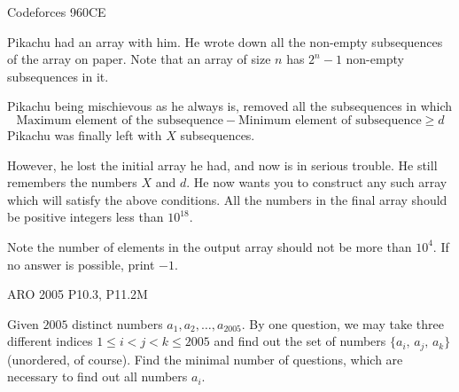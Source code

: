 


{Codeforces 960C}{E}{
    Pikachu had an array with him. He wrote down all the non-empty
    subsequences of the array on paper. Note that an array of size $n$ has 
    $2^n - 1$ non-empty subsequences in it.

    Pikachu being mischievous as he always is, removed all the subsequences in
    which \[ \text{Maximum element of the subsequence} - \text{Minimum element
    of subsequence} \geq d \]
    Pikachu was finally left with $X$ subsequences.

    However, he lost the initial array he had, and now is in serious trouble.
    He still remembers the numbers $X$ and $d$. He now wants you to
    construct any such array which will satisfy the above conditions. All the
    numbers in the final array should be positive integers less than $10^{18}$.

    Note the number of elements in the output array should not be more than
    $10^4$. If no answer is possible, print $-1$.
}\label{problem:constructive_algo_3}


{ARO 2005 P10.3, P11.2}{M}{
    Given $2005$ distinct numbers $a_1,a_2,\dots,a_{2005}$. By one question,
    we may take three different indices $1\le i<j<k\le 2005$ and find out the
    set of numbers $\{a_i,\,a_j,\,a_k\}$ (unordered, of course). Find the
    minimal number of questions, which are necessary to find out all numbers
    $a_i$.

}\label{problem:constructive_algo_4}




